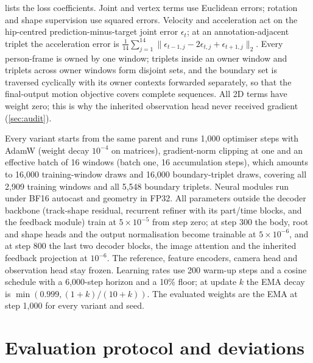 \documentclass[10pt,onecolumn,letterpaper]{article}
\begin{document}
 lists the loss coefficients.
Joint and vertex terms use Euclidean errors; rotation and shape supervision use squared errors.
Velocity and acceleration act on the hip-centred prediction-minus-target joint error $\epsilon_t$; at an annotation-adjacent triplet the acceleration error is $\frac{1}{14}\sum_{j=1}^{14}\lVert\epsilon_{t-1,j}-2\epsilon_{t,j}+\epsilon_{t+1,j}\rVert_2$.
Every person-frame is owned by one window; triplets inside an owner window and triplets across owner windows form disjoint sets, and the boundary set is traversed cyclically with its owner contexts forwarded separately, so that the final-output motion objective covers complete sequences.
All 2D terms have weight zero; this is why the inherited observation head never received gradient (\cref{sec:audit}).

Every variant starts from the same parent and runs 1,000 optimiser steps with AdamW (weight decay $10^{-4}$ on matrices), gradient-norm clipping at one and an effective batch of 16 windows (batch one, 16 accumulation steps), which amounts to 16,000 training-window draws and 16,000 boundary-triplet draws, covering all 2,909 training windows and all 5,548 boundary triplets.
Neural modules run under BF16 autocast and geometry in FP32.
All parameters outside the decoder backbone (track-shape residual, recurrent refiner with its part/time blocks, and the feedback module) train at $5\times10^{-5}$ from step zero; at step 300 the body, root and shape heads and the output normalisation become trainable at $5\times10^{-6}$, and at step 800 the last two decoder blocks, the image attention and the inherited feedback projection at $10^{-6}$.
The reference, feature encoders, camera head and observation head stay frozen.
Learning rates use 200 warm-up steps and a cosine schedule with a 6,000-step horizon and a 10\% floor; at update $k$ the EMA decay is $\min(0.999,(1+k)/(10+k))$.
The evaluated weights are the EMA at step 1,000 for every variant and seed.

\section{Evaluation protocol and deviations}
\label{sec:protocol}
\end{document}
